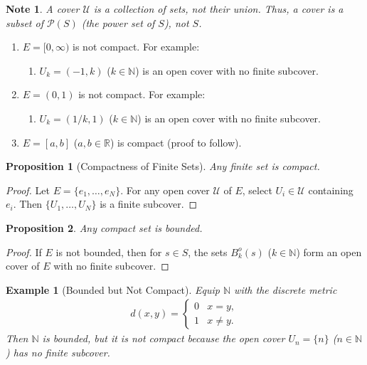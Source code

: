 \documentclass[7pt]{article}
\theoremstyle{definition}
\theoremstyle{plain}
\newtheorem{proposition}{Proposition}
\newtheorem{example}{Example}
\newtheorem{note}{Note}
\begin{document}
\begin{note}
A cover $ \mathcal{U} $ is a collection of sets, not their union. Thus, a cover is a subset of $ \mathcal{P}(S) $ (the power set of $ S $), not $ S $.
\end{note}

\begin{enumerate}
    \item $ E = [0, \infty) $ is not compact. For example:
    \begin{enumerate}
        \item $ U_k = (-1, k) $ ($ k \in \mathbb{N} $) is an open cover with no finite subcover.
    \end{enumerate}
    \item $ E = (0, 1) $ is not compact. For example:
    \begin{enumerate}
        \item $ U_k = (1/k, 1) $ ($ k \in \mathbb{N} $) is an open cover with no finite subcover.
    \end{enumerate}
    \item $ E = [a, b] $ ($ a, b \in \mathbb{R} $) is compact (proof to follow).
\end{enumerate}

\begin{proposition}[Compactness of Finite Sets]
Any finite set is compact.
\end{proposition}
\begin{proof}
Let $ E = \{e_1, \ldots, e_N\} $. For any open cover $ \mathcal{U} $ of $ E $, select $ U_i \in \mathcal{U} $ containing $ e_i $. Then $ \{U_1, \ldots, U_N\} $ is a finite subcover.
\end{proof}

\begin{proposition}
Any compact set is bounded.
\end{proposition}
\begin{proof}
If $ E $ is not bounded, then for $ s \in S $, the sets $ B_k^o(s) $ ($ k \in \mathbb{N} $) form an open cover of $ E $ with no finite subcover.
\end{proof}

\begin{example}[Bounded but Not Compact]
Equip $ \mathbb{N} $ with the discrete metric 
\begin{align}
     d(x, y) = 
\begin{cases} 
0 & x = y, \\
1 & x \neq y.
\end{cases} 
\end{align}
Then $ \mathbb{N} $ is bounded, but it is not compact because the open cover $ U_n = \{n\} $ ($ n \in \mathbb{N} $) has no finite subcover.
\end{example}
\end{document}
